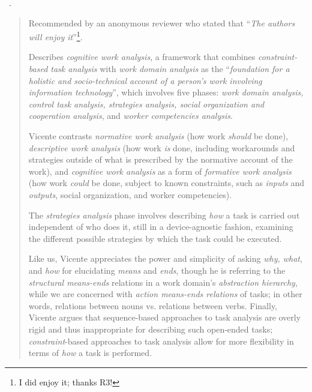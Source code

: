 \begin{sloppypar}
~\cite{Vicente1999}. \end{sloppypar}

\begin{quotation}
    Recommended by an anonymous reviewer who stated that ``{\it The authors will enjoy it}''\footnote{I did enjoy it; thanks R3!}.
    
    Describes {\it cognitive work analysis}, a framework that combines {\it constraint-based task analysis} with {\it work domain analysis} as the ``{\it foundation for a holistic and socio-technical account of a person's work involving information technology}'', which involves five phases: {\it work domain analysis, control task analysis, strategies analysis, social organization and cooperation analysis}, and {\it worker competencies analysis}. 
    
    Vicente contrasts {\it normative work analysis} (how work {\it should} be done), {\it descriptive work analysis} (how work {\it is} done, including workarounds and strategies outside of what is prescribed by the normative account of the work), and {\it cognitive work analysis} as a form of {\it formative work analysis} (how work {\it could} be done, subject to known constraints, such as {\it inputs} and {\it outputs}, social organization, and worker competencies). 
    
    The {\it strategies analysis} phase involves describing {\it how} a task is carried out independent of who does it, still in a device-agnostic fashion, examining the different possible strategies by which the task could be executed.
    
    Like us, Vicente appreciates the power and simplicity of asking {\it why, what}, and {\it how} for elucidating {\it means} and {\it ends}, though he is referring to the {\it structural means-ends} relations in a work domain's {\it abstraction hierarchy}, while we are concerned with {\it action means-ends relations} of tasks; in other words, relations between nouns vs. relations between verbs. 
    Finally, Vicente argues that sequence-based approaches to task analysis are overly rigid and thus inappropriate for describing such open-ended tasks; {\it constraint}-based approaches to task analysis allow for more flexibility in terms of {\it how} a task is performed.
\end{quotation}

